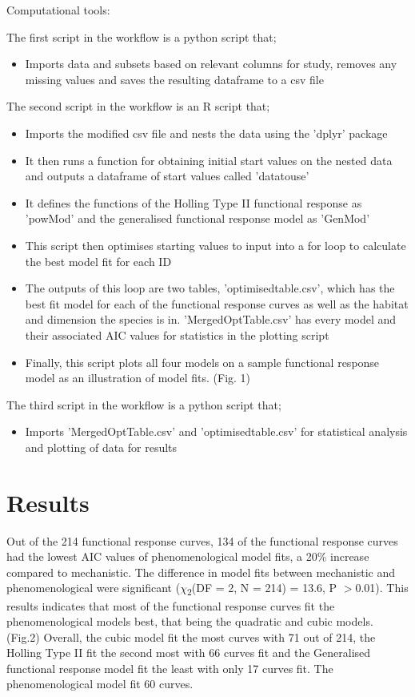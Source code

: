 \documentclass[11pt]{article}
\begin{document}
Computational tools: \newline



The first script in the workflow is a python script that;
	\begin{itemize}
	\item Imports data and subsets based on relevant columns for study, removes any missing values and saves the resulting dataframe to a csv file 
	\end{itemize}

The second script in the workflow is an R script that;
\begin{itemize}
	\item Imports the modified csv file and nests the data using the 'dplyr' package 
	\item It then runs a function for obtaining initial start values on the nested data and outputs a dataframe of start values called 'datatouse'
	\item It defines the functions of the Holling Type II functional response as 'powMod' and the generalised functional response model as 'GenMod'
	\item This script then optimises starting values to input into a for loop to calculate the best model fit for each ID 
	\item The outputs of this loop are two tables, 'optimisedtable.csv', which has the best fit model for each of the functional response curves as well as the habitat and dimension the species is in. 'MergedOptTable.csv' has every model and their associated AIC values for statistics in the plotting script 
	\item Finally, this script plots all four models on a sample functional response model as an illustration of model fits. (Fig. 1)
\end{itemize}

The third script in the workflow is a python script that;
\begin{itemize}
	\item Imports 'MergedOptTable.csv' and 'optimisedtable.csv' for statistical analysis and plotting of data for results 
\end{itemize}


	\section*{Results}
\noindent

Out of the 214 functional response curves, 134 of the functional response curves had the lowest AIC values of phenomenological model fits, a 20\% increase compared to mechanistic. The difference in model fits between mechanistic and phenomenological were significant ($\chi$\textsubscript{2}(DF = 2, N = 214) = 13.6, P $>$0.01).  This results indicates that most of the functional response curves fit the phenomenological models best, that being the quadratic and cubic models. (Fig.2) Overall, the cubic model fit the most curves with 71 out of 214, the Holling Type II fit the second most with 66 curves fit and the Generalised functional response model fit the least with only 17 curves fit. The phenomenological model fit 60 curves. \newline
\end{document}
